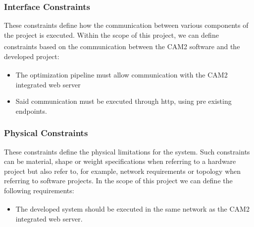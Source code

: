 \subsubsection{Interface Constraints} 

These constraints define how the communication between various components of the project is executed. Within the scope of this project, we can define constraints based on the communication between the CAM2\textsuperscript{\textregistered} software and the developed project:

\begin{itemize}
	\item The optimization pipeline must allow communication with the CAM2\textsuperscript{\textregistered} integrated web server
	\item Said communication must be executed through \acrfull{http}, using pre existing endpoints.
\end{itemize}

\subsubsection{Physical Constraints}

These constraints define the physical limitations for the system. Such constraints can be material, shape or weight specifications when referring to a hardware project but also refer to, for example, network requirements or topology when referring to software projects. In the scope of this project we can define the following requirements:

\begin{itemize}
	\item The developed system should be executed in the same network as the CAM2\textsuperscript{\textregistered} integrated web server.
\end{itemize}
